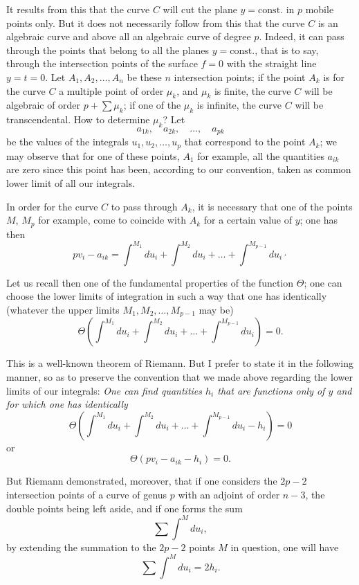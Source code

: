 \documentclass{article}
\begin{document}
It results from this that the curve $C$ will cut the plane $y = \text{const.}$ in $p$ mobile points only. But it does not necessarily follow from this that the curve $C$ is an algebraic curve and above all an algebraic curve of degree $p$. Indeed, it can pass through the points that belong to all the planes $y = \text{const.}$, that is to say, through the intersection points of the surface $f = 0$ with the straight line $y = t = 0$. Let $A_{1}, A_{2}, \ldots, A_{n}$
be these $n$ intersection points; if the point $A_{k}$ is for the curve $C$ a multiple point of order $\mu_{k}$, and $\mu_{k}$ is finite, the curve $C$ will be algebraic of order $p + \displaystyle\sum \mu_{k}$; if one of the $\mu_{k}$ is infinite, the curve $C$ will be transcendental. How to determine $\mu_{k}$? Let
\[
a_{1k}, \quad a_{2k}, \quad \ldots, \quad a_{pk}
\]
be the values of the integrals $u_{1}, u_{2}, \ldots, u_{p}$ that correspond to the point $A_{k}$; we may observe that for one of these points, $A_{1}$ for example, all the quantities $a_{ik}$ are zero since this point has been, according to our convention, taken as common lower limit of all our integrals.

In order for the curve $C$ to pass through $A_{k}$, it is necessary that one of the points $M$, $M_{p}$ for example, come to coincide with $A_{k}$ for a certain value of $y$; one has then
\[
p v_{i} - a_{ik} = \int^{M_{1}} du_{i} + \int^{M_{2}} du_{i} + \ldots + \int^{M_{p-1}} du_{i} \cdot
\]

Let us recall then one of the fundamental properties of the function $\Theta$; one can choose the lower limits of integration in such a way that one has identically (whatever the upper limits $M_{1}, M_{2}, \ldots, M_{p-1}$ may be)
\[
\Theta\left( \int^{M_{1}} du_{i} + \int^{M_{2}} du_{i} + \ldots + \int^{M_{p-1}} du_{i} \right) = 0.
\]

This is a well-known theorem of Riemann. But I prefer to state it in the following manner, so as to preserve the convention that we made above regarding the lower limits of our integrals: \emph{One can find quantities $h_{i}$ that are functions only of $y$ and for which one has identically}
\[
\Theta\left( \int^{M_{1}} du_{i} + \int^{M_{2}} du_{i} + \ldots + \int^{M_{p-1}} du_{i} - h_{i} \right) = 0
\]
or
\[
\Theta(p v_{i} - a_{ik} - h_{i}) = 0. \tag{2}
\]

But Riemann demonstrated, moreover, that if one considers the $2p - 2$ intersection points of a curve of genus $p$ with an adjoint of order $n - 3$, the double points being left aside, and if one forms the sum
\[
\sum \int^{M} du_{i}, \tag{3}
\]
by extending the summation to the $2p - 2$ points $M$ in question, one will have
\[
\sum \int^{M} du_{i} = 2 h_{i}. \tag{3 bis}
\]
\end{document}
